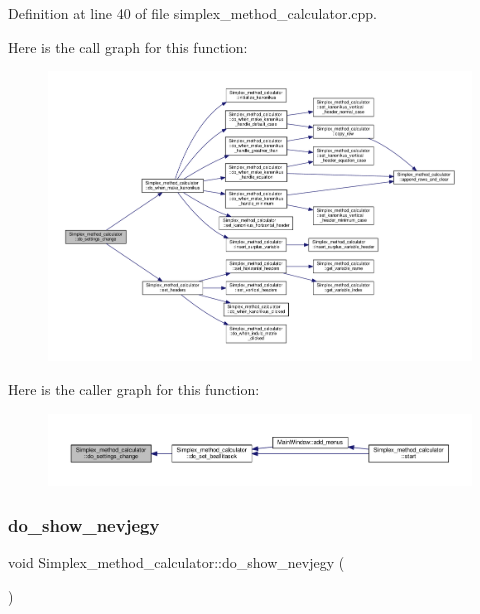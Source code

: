 Definition at line 40 of file simplex\+\_\+method\+\_\+calculator.\+cpp.

Here is the call graph for this function\+:\nopagebreak
\begin{figure}[H]
\begin{center}
\leavevmode
\includegraphics[width=350pt]{classSimplex__method__calculator_a3f71df14afb7d06f4ed6c1d403d44fcd_cgraph}
\end{center}
\end{figure}
Here is the caller graph for this function\+:\nopagebreak
\begin{figure}[H]
\begin{center}
\leavevmode
\includegraphics[width=350pt]{classSimplex__method__calculator_a3f71df14afb7d06f4ed6c1d403d44fcd_icgraph}
\end{center}
\end{figure}
\mbox{\label{classSimplex__method__calculator_a6c4492e8a18bc5abefba6f0f9eb2ecba}} 
\subsubsection{\texorpdfstring{do\+\_\+show\+\_\+nevjegy}{do\_show\_nevjegy}}
{\footnotesize\ttfamily void Simplex\+\_\+method\+\_\+calculator\+::do\+\_\+show\+\_\+nevjegy (\begin{DoxyParamCaption}{ }\end{DoxyParamCaption})\hspace{0.3cm}{\ttfamily [slot]}}



